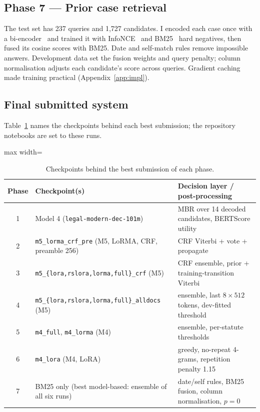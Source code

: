 \documentclass[11pt, oneside]{article}
\newcommand{\run}[1]{\texttt{#1}}
\begin{document}
\subsection{Phase 7 --- Prior case retrieval}\label{sec:p7}
The test set has 237 queries and 1{,}727 candidates. I encoded each case once with a bi-encoder~\cite{dpr} and
trained it with InfoNCE~\cite{infonce} and BM25~\cite{bm25} hard negatives, then fused its cosine scores with BM25.
Date and self-match rules remove impossible answers. Development data set the fusion weights and query penalty;
column normalisation adjusts each candidate's score across queries. Gradient caching made training practical
(Appendix~\ref{app:impl}).

\subsection{Final submitted system}
Table~\ref{tab:final} names the checkpoints behind each best submission; the repository notebooks are set to these runs.

\begin{table}[htbp]
\centering\small
\caption{Checkpoints behind the best submission of each phase.}
\label{tab:final}
\begin{adjustbox}{max width=\textwidth}
\begin{tabular}{cll}
\toprule
Phase & Checkpoint(s) & Decision layer / post-processing\\
\midrule
1 & Model 4 (\texttt{legal-modern-dec-101m}) & MBR over 14 decoded candidates, BERTScore utility\\
2 & \run{m5\_lorma\_crf\_pre} (M5, LoRMA, CRF, preamble 256) & CRF Viterbi + vote + propagate\\
3 & \run{m5\_\{lora,rslora,lorma,full\}\_crf} (M5) & CRF ensemble, prior + training-transition Viterbi\\
4 & \run{m5\_\{lora,rslora,lorma,full\}\_alldocs} (M5) & ensemble, last $8\times512$ tokens, dev-fitted threshold\\
5 & \run{m4\_full}, \run{m4\_lorma} (M4) & ensemble, per-statute thresholds\\
6 & \run{m4\_lora} (M4, LoRA) & greedy, no-repeat 4-grams, repetition penalty 1.15\\
7 & BM25 only (best model-based: ensemble of all six runs) & date/self rules, BM25 fusion, column normalisation, $p{=}0$\\
\bottomrule
\end{tabular}
\end{adjustbox}
\end{table}
\end{document}
